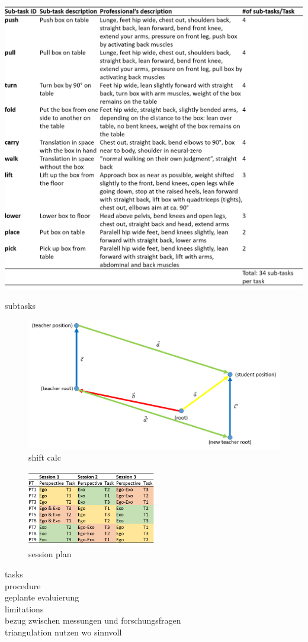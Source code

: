 \begin{table}[htb]
	\centering
	\includegraphics[width=\textwidth]{figures/sub_tasks_definition.png}
	\caption[Description of sub-tasks]{subtasks}
	\label{tab:sub-tasks}
\end{table}

\begin{figure}[htb]
	\centering
	\includegraphics[width=\textwidth]{figures/shift_calc.png}
	\caption[shift calc]{shift calc}
	\label{fig:shift_calc}
\end{figure}



\begin{figure}[htb]
	\centering
	\includegraphics[width=0.5\textwidth]{figures/study_session_plan.png}
	\caption[session plan]{session plan}
	\label{fig:study_session_plan}
\end{figure}

tasks\\
procedure\\
geplante evaluierung\\
limitations\\
bezug zwischen messungen und forschungsfragen\\
triangulation nutzen wo sinnvoll\\
